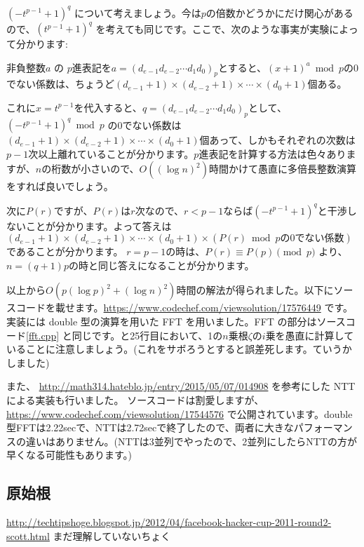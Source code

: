 \documentclass{jsarticle}
\begin{document}
  $(-t^{p-1}+1)^q$ について考えましょう。今は$p$の倍数かどうかにだけ関心があるので、$(t^{p-1}+1)^q$ を考えても同じです。ここで、次のような事実が実験によって分かります:
  \begin{center}
   非負整数$a$ の $p$進表記を$a = (d_{e-1}d_{e-2}\cdots d_1d_0)_p$とすると、$(x+1)^a \bmod p$の0でない係数は、ちょうど$(d_{e-1} + 1) \times (d_{e-2} + 1) \times \cdots \times (d_0 + 1)$個ある。
  \end{center}
  これに$x = t^{p-1}$を代入すると、$q = (d_{e-1}d_{e-2}\cdots d_1d_0)_p$として、
  $(-t^{p-1}+1)^q \bmod p$ の0でない係数は$(d_{e-1} + 1) \times (d_{e-2} + 1) \times \cdots \times (d_0 + 1)$個あって、しかもそれぞれの次数は$p-1$次以上離れていることが分かります。$p$進表記を計算する方法は色々ありますが、$n$の桁数が小さいので、$O((\log n)^2)$時間かけて愚直に多倍長整数演算をすれば良いでしょう。

  次に$P(r)$ですが、$P(r)$は$r$次なので、$r < p - 1$ならば$(-t^{p-1}+1)^q$と干渉しないことが分かります。よって答えは$(d_{e-1} + 1) \times (d_{e-2} + 1) \times \cdots \times (d_0 + 1) \times (P(r)\bmod p\mbox{の0でない係数})$であることが分かります。
  $r = p - 1$の時は、$P(r) \equiv P(p) \pmod p$ より、$n = (q + 1)p$の時と同じ答えになることが分かります。

  以上から$O(p(\log p)^2 + (\log n)^2)$時間の解法が得られました。以下にソースコードを載せます。\url{https://www.codechef.com/viewsolution/17576449} です。
  実装には double 型の演算を用いた FFT を用いました。FFT の部分はソースコード\ref{fft.cpp} と同じです。と25行目において、1の$n$乗根$\zeta$の$i$乗を愚直に計算していることに注意しましょう。(これをサボろうとすると誤差死します。ていうかしました)
  

  また、 \url{http://math314.hateblo.jp/entry/2015/05/07/014908} を参考にした NTT による実装も行いました。
  ソースコードは割愛しますが、\url{https://www.codechef.com/viewsolution/17544576} で公開されています。double型FFTは2.22secで、NTTは2.72secで終了したので、両者に大きなパフォーマンスの違いはありません。(NTTは3並列でやったので、2並列にしたらNTTの方が早くなる可能性もあります。)
  \subsection{原始根~}
  \label{subsec:convolution-with-primitive-roots}
  \url{http://techtipshoge.blogspot.jp/2012/04/facebook-hacker-cup-2011-round2-scott.html}
  まだ理解していないちょく
\end{document}
